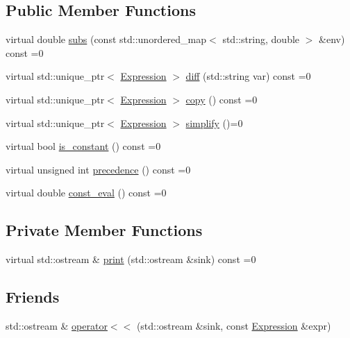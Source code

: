 \subsection*{Public Member Functions}
\begin{DoxyCompactItemize}
\item 
virtual double \hyperlink{classsymcpp_1_1Expression_aaef29b0afa2d6c21fe35f47a1be76134}{subs} (const std\+::unordered\+\_\+map$<$ std\+::string, double $>$ \&env) const =0
\item 
virtual std\+::unique\+\_\+ptr$<$ \hyperlink{classsymcpp_1_1Expression}{Expression} $>$ \hyperlink{classsymcpp_1_1Expression_a032fe8da79d5e231ca2d21a201c8f32d}{diff} (std\+::string var) const =0
\item 
virtual std\+::unique\+\_\+ptr$<$ \hyperlink{classsymcpp_1_1Expression}{Expression} $>$ \hyperlink{classsymcpp_1_1Expression_a2e7de5a295ccf0efdc9b34cea7ba3d0b}{copy} () const =0
\item 
virtual std\+::unique\+\_\+ptr$<$ \hyperlink{classsymcpp_1_1Expression}{Expression} $>$ \hyperlink{classsymcpp_1_1Expression_ab1fa6e55eea0682250d013f28db26cd2}{simplify} ()=0
\item 
virtual bool \hyperlink{classsymcpp_1_1Expression_a30db7917c8948e22330cbe8259caeae2}{is\+\_\+constant} () const =0
\item 
virtual unsigned int \hyperlink{classsymcpp_1_1Expression_a181c162d5740faac392ffdca26bfca0c}{precedence} () const =0
\item 
virtual double \hyperlink{classsymcpp_1_1Expression_a81c8069347f586cb5632338d97c278ad}{const\+\_\+eval} () const =0
\end{DoxyCompactItemize}
\subsection*{Private Member Functions}
\begin{DoxyCompactItemize}
\item 
virtual std\+::ostream \& \hyperlink{classsymcpp_1_1Expression_af37e13032a40f2da4d2866eaa8658049}{print} (std\+::ostream \&sink) const =0
\end{DoxyCompactItemize}
\subsection*{Friends}
\begin{DoxyCompactItemize}
\item 
std\+::ostream \& \hyperlink{classsymcpp_1_1Expression_ade0d81d94acc2274ae8657f14d5636fe}{operator$<$$<$} (std\+::ostream \&sink, const \hyperlink{classsymcpp_1_1Expression}{Expression} \&expr)
\end{DoxyCompactItemize}


